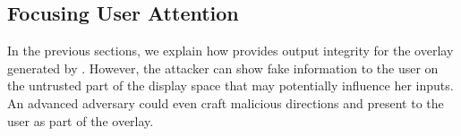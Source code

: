 

\subsection{Focusing User Attention}
\label{sec:systemDesign:userAttention}

In the previous sections, we explain how \name provides output integrity for the overlay generated by \device. However, the attacker can show fake information to the user on the untrusted part of the display space that may potentially influence her inputs. An advanced adversary could even craft malicious directions and present to the user as part of the overlay.


